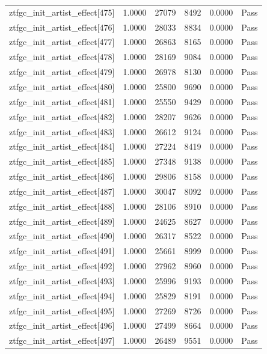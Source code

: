 \begin{table}[htbp]
\begin{tabular}{llrrll}
ztfgc\_init\_artist\_effect[475] & 1.0000 & 27079 & 8492 & 0.0000 & Pass \\
ztfgc\_init\_artist\_effect[476] & 1.0000 & 28033 & 8834 & 0.0000 & Pass \\
ztfgc\_init\_artist\_effect[477] & 1.0000 & 26863 & 8165 & 0.0000 & Pass \\
ztfgc\_init\_artist\_effect[478] & 1.0000 & 28169 & 9084 & 0.0000 & Pass \\
ztfgc\_init\_artist\_effect[479] & 1.0000 & 26978 & 8130 & 0.0000 & Pass \\
ztfgc\_init\_artist\_effect[480] & 1.0000 & 25800 & 9690 & 0.0000 & Pass \\
ztfgc\_init\_artist\_effect[481] & 1.0000 & 25550 & 9429 & 0.0000 & Pass \\
ztfgc\_init\_artist\_effect[482] & 1.0000 & 28207 & 9626 & 0.0000 & Pass \\
ztfgc\_init\_artist\_effect[483] & 1.0000 & 26612 & 9124 & 0.0000 & Pass \\
ztfgc\_init\_artist\_effect[484] & 1.0000 & 27224 & 8419 & 0.0000 & Pass \\
ztfgc\_init\_artist\_effect[485] & 1.0000 & 27348 & 9138 & 0.0000 & Pass \\
ztfgc\_init\_artist\_effect[486] & 1.0000 & 29806 & 8158 & 0.0000 & Pass \\
ztfgc\_init\_artist\_effect[487] & 1.0000 & 30047 & 8092 & 0.0000 & Pass \\
ztfgc\_init\_artist\_effect[488] & 1.0000 & 28106 & 8910 & 0.0000 & Pass \\
ztfgc\_init\_artist\_effect[489] & 1.0000 & 24625 & 8627 & 0.0000 & Pass \\
ztfgc\_init\_artist\_effect[490] & 1.0000 & 26317 & 8522 & 0.0000 & Pass \\
ztfgc\_init\_artist\_effect[491] & 1.0000 & 25661 & 8999 & 0.0000 & Pass \\
ztfgc\_init\_artist\_effect[492] & 1.0000 & 27962 & 8960 & 0.0000 & Pass \\
ztfgc\_init\_artist\_effect[493] & 1.0000 & 25996 & 9193 & 0.0000 & Pass \\
ztfgc\_init\_artist\_effect[494] & 1.0000 & 25829 & 8191 & 0.0000 & Pass \\
ztfgc\_init\_artist\_effect[495] & 1.0000 & 27269 & 8726 & 0.0000 & Pass \\
ztfgc\_init\_artist\_effect[496] & 1.0000 & 27499 & 8664 & 0.0000 & Pass \\
ztfgc\_init\_artist\_effect[497] & 1.0000 & 26489 & 9551 & 0.0000 & Pass \\

\end{tabular}
\end{table}

